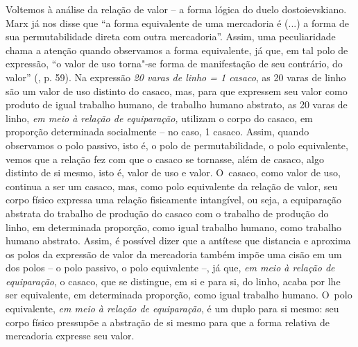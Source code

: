 {Voltemos à análise da relação de valor -- a forma lógica do duelo
dostoievskiano. Marx já nos disse que ``a forma equivalente de uma
mercadoria é (...) a forma de sua permutabilidade direta com outra
mercadoria''. Assim, uma peculiaridade chama a atenção quando observamos
a forma equivalente, já que, em tal polo de expressão, ``o valor de uso
torna"-se forma de manifestação de seu contrário, do valor'' (, p.
59). Na expressão \emph{20 varas de linho = 1 casaco}, as 20 varas de
linho são um valor de uso distinto do casaco, mas, para que expressem
seu valor como produto de igual trabalho humano, de trabalho humano
abstrato, as 20 varas de linho, \emph{em meio à relação de equiparação,}
utilizam o corpo do casaco, em proporção determinada socialmente -- no
caso, 1 casaco. Assim, quando observamos o polo passivo, isto é, o polo
de permutabilidade, o polo equivalente, vemos que a relação fez com que
o casaco se tornasse, além de casaco, algo distinto de si mesmo, isto é,
valor de uso e valor. O~casaco, como valor de uso, continua a ser um
casaco, mas, como polo equivalente da relação de valor, seu corpo físico
expressa uma relação fisicamente intangível, ou seja, a equiparação
abstrata do trabalho de produção do casaco com o trabalho de produção do
linho, em determinada proporção, como igual trabalho humano, como
trabalho humano abstrato. Assim, é possível dizer que a antítese que
distancia e aproxima os polos da expressão de valor da mercadoria também
impõe uma cisão em um dos polos -- o polo passivo, o polo equivalente
--, já que, \emph{em meio à relação de equiparação}, o casaco, que se
distingue, em si e para si, do linho, acaba por lhe ser equivalente, em
determinada proporção, como igual trabalho humano. O~polo equivalente,
\emph{em meio à relação de equiparação}, é um duplo para si mesmo: seu
corpo físico pressupõe a abstração de si mesmo para que a forma relativa
de mercadoria expresse seu valor.

}
